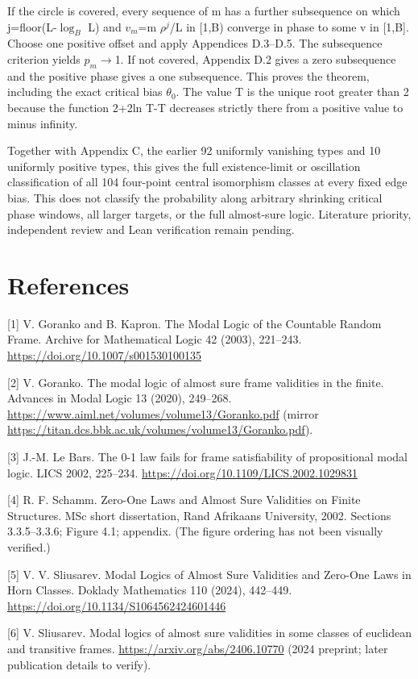 \documentclass[11pt]{article}
\begin{document}
If the circle is covered, every sequence of m has a further subsequence on which j=floor(L-$\log_B$ L) and $v_{m}$=m $\rho^{j}$/L in [1,B) converge in phase to some v in [1,B]. Choose one positive offset and apply Appendices D.3--D.5. The subsequence criterion yields $p_m$\ensuremath{\to}1. If not covered, Appendix D.2 gives a zero subsequence and the positive phase gives a one subsequence. This proves the theorem, including the exact critical bias $\theta_{0}$. The value T is the unique root greater than 2 because the function 2+2ln T-T decreases strictly there from a positive value to minus infinity.

Together with Appendix C, the earlier 92 uniformly vanishing types and 10 uniformly positive types, this gives the full existence-limit or oscillation classification of all 104 four-point central isomorphism classes at every fixed edge bias. This does not classify the probability along arbitrary shrinking critical phase windows, all larger targets, or the full almost-sure logic. Literature priority, independent review and Lean verification remain pending.


\section*{References}

[1] V. Goranko and B. Kapron. The Modal Logic of the Countable Random Frame. Archive for Mathematical Logic 42 (2003), 221--243. \url{https://doi.org/10.1007/s001530100135}

[2] V. Goranko. The modal logic of almost sure frame validities in the finite. Advances in Modal Logic 13 (2020), 249--268. \url{https://www.aiml.net/volumes/volume13/Goranko.pdf} (mirror \url{https://titan.dcs.bbk.ac.uk/volumes/volume13/Goranko.pdf}).

[3] J.-M. Le Bars. The 0-1 law fails for frame satisfiability of propositional modal logic. LICS 2002, 225--234. \url{https://doi.org/10.1109/LICS.2002.1029831}

[4] R. F. Schamm. Zero-One Laws and Almost Sure Validities on Finite Structures. MSc short dissertation, Rand Afrikaans University, 2002. Sections 3.3.5--3.3.6; Figure 4.1; appendix. (The figure ordering has not been visually verified.)

[5] V. V. Sliusarev. Modal Logics of Almost Sure Validities and Zero-One Laws in Horn Classes. Doklady Mathematics 110 (2024), 442--449. \url{https://doi.org/10.1134/S1064562424601446}

[6] V. Sliusarev. Modal logics of almost sure validities in some classes of euclidean and transitive frames. \url{https://arxiv.org/abs/2406.10770} (2024 preprint; later publication details to verify).
\end{document}
